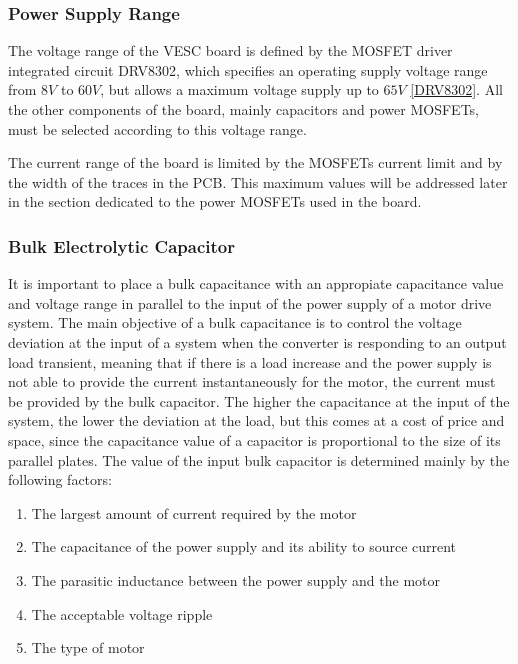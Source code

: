 \subsubsection{Power Supply Range}

The voltage range of the VESC board is defined by the \ac{MOSFET} driver integrated circuit DRV8302, which specifies an operating supply voltage range from $8V$ to $60V$, but allows a maximum voltage supply up to $65V$ \ref{DRV8302}. All the other components of the board, mainly capacitors and power \ac{MOSFET}s, must be selected according to this voltage range.

The current range of the board is limited by the \ac{MOSFET}s current limit and by the width of the traces in the \ac{PCB}. This maximum values will be addressed later in the section dedicated to the power \ac{MOSFET}s used in the board.


\subsubsection{Bulk Electrolytic Capacitor}

It is important to place a bulk capacitance with an appropiate capacitance value and voltage range in parallel to the input of the power supply of a motor drive system. The main objective of a bulk capacitance is to control the voltage deviation at the input of a system when the converter is responding to an output load transient, meaning that if there is a load increase and the power supply is not able to provide the current instantaneously for the motor, the current must be provided by the bulk capacitor. The higher the capacitance at the input of the system, the lower the deviation at the load, but this comes at a cost of price and space, since the capacitance value of a capacitor is proportional to the size of its parallel plates. The value of the input bulk capacitor is determined mainly by the following factors:

\begin {enumerate}
	\item The largest amount of current required by the motor
	\item The capacitance of the power supply and its ability to source current
	\item The parasitic inductance between the power supply and the motor
	\item The acceptable voltage ripple
	\item The type of motor
\end {enumerate}

